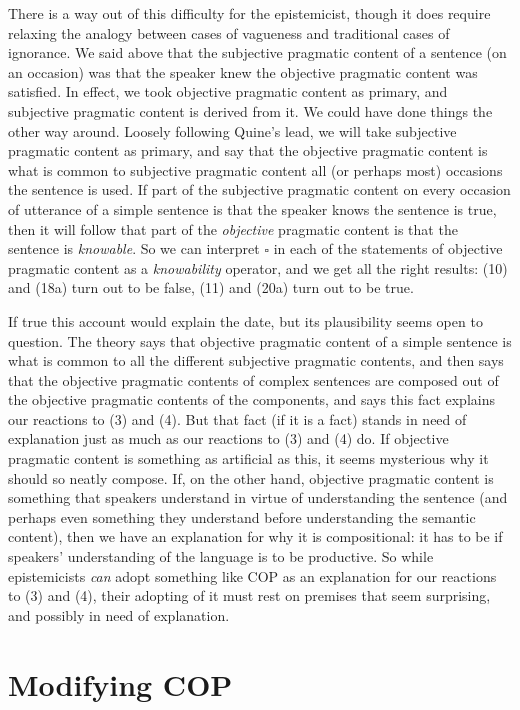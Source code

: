 There is a way out of this difficulty for the epistemicist, though it does require relaxing the analogy between cases of vagueness and traditional cases of ignorance. We said above that the subjective pragmatic content of a sentence (on an occasion) was that the speaker knew the objective pragmatic content was satisfied. In effect, we took objective pragmatic content as primary, and subjective pragmatic content is derived from it. We could have done things the other way around. Loosely following Quine's lead, we will take subjective pragmatic content as primary, and say that the objective pragmatic content is what is common to subjective pragmatic content all (or perhaps most) occasions the sentence is used. If part of the subjective pragmatic content on every occasion of utterance of a simple sentence is that the speaker knows the sentence is true, then it will follow that part of the \textit{objective} pragmatic content is that the sentence is \textit{knowable}. So we can interpret \(\square\)  in each of the statements of objective pragmatic content as a \textit{knowability} operator, and we get all the right results: (10) and (18a) turn out to be false, (11) and (20a) turn out to be true.

If true this account would explain the date, but its plausibility seems open to question. The theory says that objective pragmatic content of a simple sentence is what is common to all the different subjective pragmatic contents, and then says that the objective pragmatic contents of complex sentences are composed out of the objective pragmatic contents of the components, and says this fact explains our reactions to (3) and (4). But that fact (if it is a fact) stands in need of explanation just as much as our reactions to (3) and (4) do. If objective pragmatic content is something as artificial as this, it seems mysterious why it should so neatly compose. If, on the other hand, objective pragmatic content is something that speakers understand in virtue of understanding the sentence (and perhaps even something they understand before understanding the semantic content), then we have an explanation for why it is compositional: it has to be if speakers' understanding of the language is to be productive. So while epistemicists \textit{can} adopt something like COP as an explanation for our reactions to (3) and (4), their adopting of it must rest on premises that seem surprising, and possibly in need of explanation. 

\section{Modifying COP}

